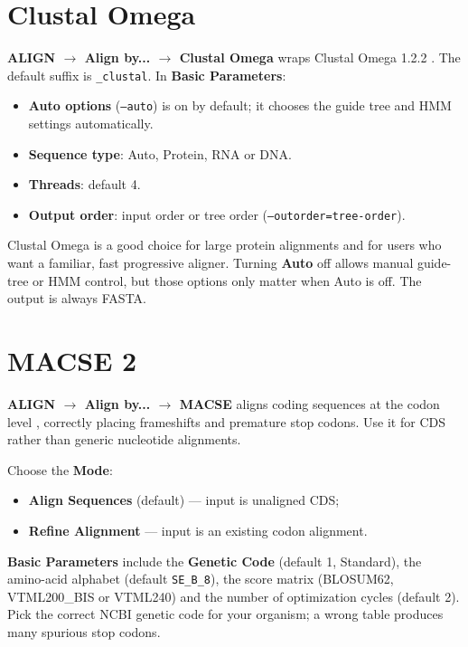 \documentclass[10pt]{report}
\begin{document}
\section{Clustal Omega}

\textbf{ALIGN $\rightarrow$ Align by... $\rightarrow$ Clustal Omega} wraps
Clustal Omega 1.2.2 \cite{clustalo}. The default suffix is \texttt{\_clustal}. In
\textbf{Basic Parameters}:

\begin{itemize}
  \item \textbf{Auto options} (\texttt{--auto}) is on by default; it chooses
        the guide tree and HMM settings automatically.
  \item \textbf{Sequence type}: Auto, Protein, RNA or DNA.
  \item \textbf{Threads}: default 4.
  \item \textbf{Output order}: input order or tree order
        (\texttt{--outorder=tree-order}).
\end{itemize}

Clustal Omega is a good choice for large protein alignments and for users who
want a familiar, fast progressive aligner. Turning \textbf{Auto} off allows
manual guide-tree or HMM control, but those options only matter when Auto is
off. The output is always FASTA.

\section{MACSE 2}

\textbf{ALIGN $\rightarrow$ Align by... $\rightarrow$ MACSE} aligns coding
sequences at the codon level \cite{macse}, correctly placing frameshifts and
premature stop codons. Use it for CDS rather than generic nucleotide alignments.

Choose the \textbf{Mode}:

\begin{itemize}
  \item \textbf{Align Sequences} (default) --- input is unaligned CDS;
  \item \textbf{Refine Alignment} --- input is an existing codon alignment.
\end{itemize}

\textbf{Basic Parameters} include the \textbf{Genetic Code} (default 1,
Standard), the amino-acid alphabet (default \texttt{SE\_B\_8}), the score matrix
(BLOSUM62, VTML200\_BIS or VTML240) and the number of optimization cycles
(default 2). Pick the correct NCBI genetic code for your organism; a wrong table
produces many spurious stop codons.
\end{document}
